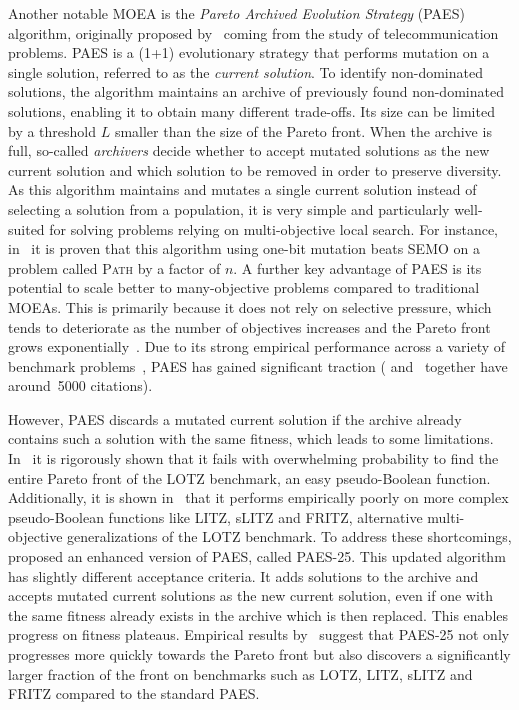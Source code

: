 \documentclass[
sigconf = false, %
review = false, %
screen = true, %
anonymous = true, %
format=acmsmall
]{acmart}
\newcommand{\LOTZ}{\textsc{LOTZ}\xspace}
\newcommand{\PAES}{PAES-25\xspace}
\begin{document}
Another notable MOEA is the \emph{Pareto Archived Evolution Strategy} (PAES) algorithm, originally proposed by~\citet{781913} coming from the study of telecommunication problems. PAES is a (1+1) evolutionary strategy that performs mutation on a single solution, referred to as the \emph{current solution}. To identify non-dominated solutions, the algorithm maintains an archive of previously found non-dominated solutions, enabling it to obtain many different trade-offs. Its size can be limited by a threshold $L$ smaller than the size of the Pareto front. When the archive is full, so-called \emph{archivers} decide whether to accept mutated solutions as the new current solution and which solution to be removed in order to preserve diversity. As this algorithm maintains and mutates a single current solution instead of selecting a solution from a population, it is very simple and particularly well-suited for solving problems relying on multi-objective local search. For instance, in~\cite{PAESFIRST} it is proven that this algorithm using one-bit mutation beats SEMO on a problem called \textsc{Path} by a factor of $n$. A further key advantage of PAES is its potential to scale better to many-objective problems compared to traditional MOEAs. This is primarily because it does not rely on selective pressure, which tends to deteriorate as the number of objectives increases and the Pareto front grows exponentially~\cite{OprisNSGAIII,Zheng_Doerr_2024,Opris2025,DoerrNearTight}. Due to its strong empirical performance across a variety of benchmark problems~\cite{781913}, PAES has gained significant traction (\cite{781913} and~\cite{Knowles2000} together have around~5000 citations). 

However, PAES discards a mutated current solution if the archive already contains such a solution with the same fitness, which leads to some limitations. In~\cite{PAESFIRST} it is rigorously shown that it fails with overwhelming probability to find the entire Pareto front of the \LOTZ benchmark, an easy pseudo-Boolean function. Additionally, it is shown in~\cite{Knowles2025} that it performs empirically poorly on more complex pseudo-Boolean functions like LITZ, sLITZ and FRITZ, alternative multi-objective generalizations of the \LOTZ benchmark. To address these shortcomings, \citet{Knowles2025} proposed an enhanced version of PAES, called \PAES. This updated algorithm has slightly different acceptance criteria. It adds solutions to the archive and accepts mutated current solutions as the new current solution, even if one with the same fitness already exists in the archive which is then  replaced. This enables progress on fitness plateaus. Empirical results by~\citet{Knowles2025} suggest that \PAES not only progresses more quickly towards the Pareto front but also discovers a significantly larger fraction of the front on benchmarks such as \LOTZ, LITZ, sLITZ and FRITZ compared to the standard PAES.
\end{document}
